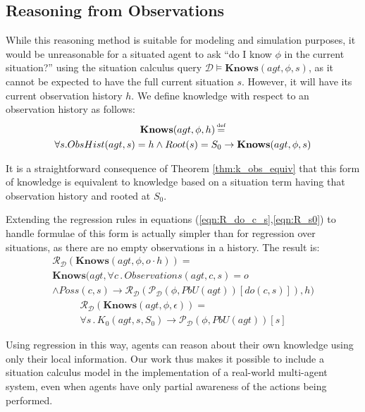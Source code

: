 \documentclass{ifaamas-submission}
\newcommand{\isdef}{\hbox{$\stackrel{\mbox{\tiny def}}{=}$}}
\begin{document}
\subsection{Reasoning from Observations}

While this reasoning method is suitable for modeling and simulation
purposes, it would be unreasonable for a situated agent to ask {}``do
I know $\phi$ in the current situation?'' using the situation calculus
query $\mathcal{D}\models\mathbf{Knows}(agt,\phi,s)$, as it cannot
be expected to have the full current situation $s$. However, it will
have its current observation history $h$. We define knowledge with
respect to an observation history as follows:\begin{multline*}
\mathbf{Knows}(agt,\phi,h)\,\isdef\\
\forall s.ObsHist(agt,s)=h\wedge Root(s)=S_{0}\rightarrow\mathbf{Knows}(agt,\phi,s)\end{multline*}


It is a straightforward consequence of Theorem \ref{thm:k_obs_equiv}
that this form of knowledge is equivalent to knowledge based on a
situation term having that observation history and rooted at $S_{0}$.

Extending the regression rules in equations (\ref{eqn:R_do_c_s},\ref{eqn:R_s0})
to handle formulae of this form is actually simpler than for regression
over situations, as there are no empty observations in a history.
The result is: \begin{multline*}
\mathcal{R}_{\mathcal{D}}(\mathbf{Knows}(agt,\phi,o\cdot h))=\\
\mathbf{Knows}(agt,\forall c\,.\, Observations(agt,c,s)=o\\
\wedge Poss(c,s)\rightarrow\mathcal{R}_{\mathcal{D}}(\mathcal{P}_{\mathcal{D}}(\phi,PbU(agt))[do(c,s)]),h)\end{multline*}
\begin{multline*}
\mathcal{R}_{\mathcal{D}}(\mathbf{Knows}(agt,\phi,\epsilon))=\\
\forall s\,.\, K_{0}(agt,s,S_{0})\rightarrow\mathcal{P}_{\mathcal{D}}(\phi,PbU(agt))[s]\end{multline*}


Using regression in this way, agents can reason about their own knowledge
using only their local information. Our work thus makes it possible
to include a situation calculus model in the implementation of a real-world
multi-agent system, even when agents have only partial awareness of
the actions being performed.
\end{document}
